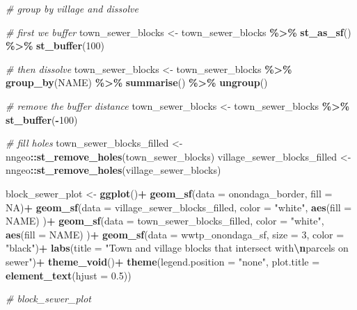 \documentclass[
]{book}
\newenvironment{Shaded}{\begin{snugshade}}{\end{snugshade}}
\newcommand{\AttributeTok}[1]{\textcolor[rgb]{0.13,0.29,0.53}{#1}}
\newcommand{\CommentTok}[1]{\textcolor[rgb]{0.56,0.35,0.01}{\textit{#1}}}
\newcommand{\ConstantTok}[1]{\textcolor[rgb]{0.56,0.35,0.01}{#1}}
\newcommand{\DecValTok}[1]{\textcolor[rgb]{0.00,0.00,0.81}{#1}}
\newcommand{\FloatTok}[1]{\textcolor[rgb]{0.00,0.00,0.81}{#1}}
\newcommand{\FunctionTok}[1]{\textcolor[rgb]{0.13,0.29,0.53}{\textbf{#1}}}
\newcommand{\NormalTok}[1]{#1}
\newcommand{\OtherTok}[1]{\textcolor[rgb]{0.56,0.35,0.01}{#1}}
\newcommand{\SpecialCharTok}[1]{\textcolor[rgb]{0.81,0.36,0.00}{\textbf{#1}}}
\newcommand{\StringTok}[1]{\textcolor[rgb]{0.31,0.60,0.02}{#1}}
\begin{document}
\begin{Shaded}
\begin{Highlighting}[]
\CommentTok{\# group by village and dissolve}

\CommentTok{\# first we buffer}
\NormalTok{town\_sewer\_blocks }\OtherTok{\textless{}{-}}\NormalTok{ town\_sewer\_blocks }\SpecialCharTok{\%\textgreater{}\%}
  \FunctionTok{st\_as\_sf}\NormalTok{() }\SpecialCharTok{\%\textgreater{}\%}
  \FunctionTok{st\_buffer}\NormalTok{(}\DecValTok{100}\NormalTok{)}

\CommentTok{\# then dissolve}
\NormalTok{town\_sewer\_blocks }\OtherTok{\textless{}{-}}\NormalTok{ town\_sewer\_blocks }\SpecialCharTok{\%\textgreater{}\%} 
  \FunctionTok{group\_by}\NormalTok{(NAME) }\SpecialCharTok{\%\textgreater{}\%}
  \FunctionTok{summarise}\NormalTok{() }\SpecialCharTok{\%\textgreater{}\%}
  \FunctionTok{ungroup}\NormalTok{()}

\CommentTok{\# remove the buffer distance}
\NormalTok{town\_sewer\_blocks }\OtherTok{\textless{}{-}}\NormalTok{ town\_sewer\_blocks }\SpecialCharTok{\%\textgreater{}\%}
  \FunctionTok{st\_buffer}\NormalTok{(}\SpecialCharTok{{-}}\DecValTok{100}\NormalTok{)}

\CommentTok{\# fill holes}
\NormalTok{town\_sewer\_blocks\_filled }\OtherTok{\textless{}{-}}\NormalTok{ nngeo}\SpecialCharTok{::}\FunctionTok{st\_remove\_holes}\NormalTok{(town\_sewer\_blocks)}
\NormalTok{village\_sewer\_blocks\_filled }\OtherTok{\textless{}{-}}\NormalTok{ nngeo}\SpecialCharTok{::}\FunctionTok{st\_remove\_holes}\NormalTok{(village\_sewer\_blocks)}

\NormalTok{block\_sewer\_plot }\OtherTok{\textless{}{-}}
  \FunctionTok{ggplot}\NormalTok{()}\SpecialCharTok{+}
  \FunctionTok{geom\_sf}\NormalTok{(}\AttributeTok{data =}\NormalTok{ onondaga\_border, }\AttributeTok{fill =} \ConstantTok{NA}\NormalTok{)}\SpecialCharTok{+}
  \FunctionTok{geom\_sf}\NormalTok{(}\AttributeTok{data =}\NormalTok{ village\_sewer\_blocks\_filled, }\AttributeTok{color =} \StringTok{"white"}\NormalTok{,}
          \FunctionTok{aes}\NormalTok{(}\AttributeTok{fill =}\NormalTok{ NAME)}
\NormalTok{          )}\SpecialCharTok{+}
  \FunctionTok{geom\_sf}\NormalTok{(}\AttributeTok{data =}\NormalTok{ town\_sewer\_blocks\_filled, }\AttributeTok{color =} \StringTok{"white"}\NormalTok{,}
          \FunctionTok{aes}\NormalTok{(}\AttributeTok{fill =}\NormalTok{ NAME)}
\NormalTok{          )}\SpecialCharTok{+}
  \FunctionTok{geom\_sf}\NormalTok{(}\AttributeTok{data =}\NormalTok{ wwtp\_onondaga\_sf, }\AttributeTok{size =} \DecValTok{3}\NormalTok{, }\AttributeTok{color =} \StringTok{"black"}\NormalTok{)}\SpecialCharTok{+}
  \FunctionTok{labs}\NormalTok{(}\AttributeTok{title =} \StringTok{"Town and  village blocks that intersect with}\SpecialCharTok{\textbackslash{}n}\StringTok{parcels on sewer"}\NormalTok{)}\SpecialCharTok{+}
  \FunctionTok{theme\_void}\NormalTok{()}\SpecialCharTok{+}
  \FunctionTok{theme}\NormalTok{(}\AttributeTok{legend.position =} \StringTok{"none"}\NormalTok{,}
        \AttributeTok{plot.title =} \FunctionTok{element\_text}\NormalTok{(}\AttributeTok{hjust =} \FloatTok{0.5}\NormalTok{))}

\CommentTok{\# block\_sewer\_plot}
\end{Highlighting}
\end{Shaded}
\end{document}
